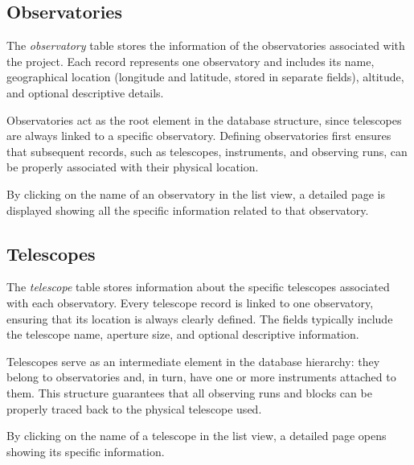 
\subsection{Observatories}

The \textsl{observatory} table stores the information of the observatories associated with the project. Each record represents one observatory and includes its name, geographical location (longitude and latitude, stored in separate fields), altitude, and optional descriptive details.

Observatories act as the root element in the database structure, since telescopes are always linked to a specific observatory. Defining observatories first ensures that subsequent records, such as telescopes, instruments, and observing runs, can be properly associated with their physical location.


By clicking on the name of an observatory in the list view, a detailed page is displayed showing all the specific information related to that observatory.


\subsection{Telescopes}

The \textsl{telescope} table stores information about the specific telescopes associated with each observatory. Every telescope record is linked to one observatory, ensuring that its location is always clearly defined. The fields typically include the telescope name, aperture size, and optional descriptive information.

Telescopes serve as an intermediate element in the database hierarchy: they belong to observatories and, in turn, have one or more instruments attached to them. This structure guarantees that all observing runs and blocks can be properly traced back to the physical telescope used.


By clicking on the name of a telescope in the list view, a detailed page opens showing its specific information.

